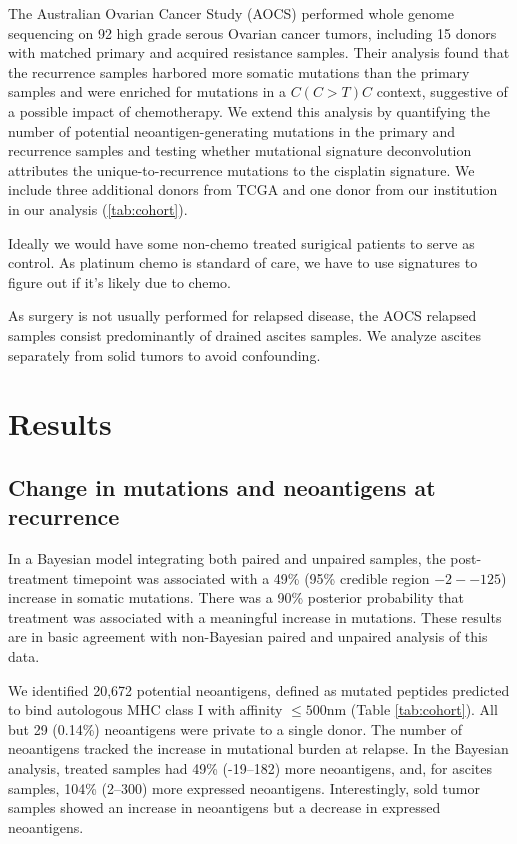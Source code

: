 The Australian Ovarian Cancer Study (AOCS)\cite{Patch_2015} performed whole genome sequencing on 92 high grade serous Ovarian cancer tumors, including 15 donors with matched primary and acquired resistance samples. Their analysis found that the recurrence samples harbored more somatic mutations than the primary samples and were enriched for mutations in a $C(C \gt T)C$ context, suggestive of a possible impact of chemotherapy. We extend this analysis by quantifying the number of potential neoantigen-generating mutations in the primary and recurrence samples and testing whether mutational signature deconvolution attributes the unique-to-recurrence mutations to the  cisplatin signature. We include three additional donors from TCGA and one donor from our institution in our analysis (\ref{tab:cohort}).

Ideally we would have some non-chemo treated surigical patients to serve as control. As platinum chemo is standard of care, we have to use signatures to figure out if it's likely due to chemo.

As surgery is not usually performed for relapsed disease, the AOCS relapsed samples consist predominantly of drained ascites samples. We analyze ascites separately from solid tumors to avoid confounding.



\section*{Results}

\subsection*{Change in mutations and neoantigens at recurrence}
In a Bayesian model integrating both paired and unpaired samples, the post-treatment timepoint was associated with a 49\% (95\% credible region $-2--125$) increase in somatic mutations. There was a 90\% posterior probability that treatment was associated with a meaningful increase in mutations. These results are in basic agreement with non-Bayesian paired and unpaired analysis of this data.

We identified 20,672 potential neoantigens, defined as mutated peptides predicted to bind autologous MHC class I with affinity $\leq 500$nm (Table \ref{tab:cohort}). All but 29 (0.14\%) neoantigens were private to a single donor. The number of neoantigens tracked the increase in mutational burden at relapse. In the Bayesian analysis, treated samples had 49\% (-19--182) more neoantigens, and, for ascites samples, 104\% (2--300) more expressed neoantigens. Interestingly, sold tumor samples showed an increase in neoantigens but a decrease in expressed neoantigens.

